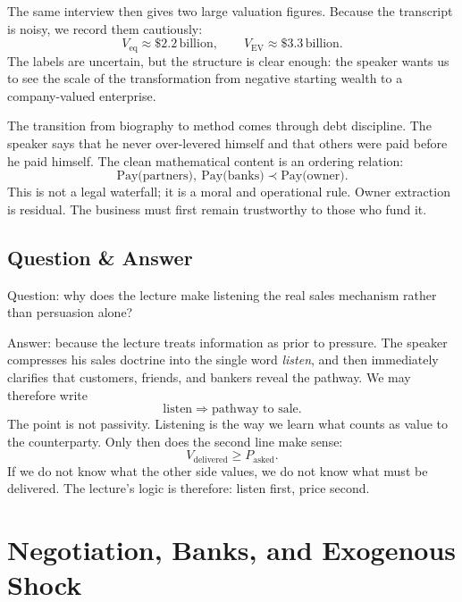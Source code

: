 The same interview then gives two large valuation figures. Because the transcript is noisy, we record them cautiously:
\begin{equation}
V_{\text{eq}} \approx \$2.2\,\text{billion}, \qquad V_{\text{EV}} \approx \$3.3\,\text{billion}.
\end{equation}
The labels are uncertain, but the structure is clear enough: the speaker wants us to see the scale of the transformation from negative starting wealth to a company-valued enterprise.

The transition from biography to method comes through debt discipline. The speaker says that he never over-levered himself and that others were paid before he paid himself. The clean mathematical content is an ordering relation:
\begin{equation}
\text{Pay(partners)},\ \text{Pay(banks)} \prec \text{Pay(owner)}.
\end{equation}
This is not a legal waterfall; it is a moral and operational rule. Owner extraction is residual. The business must first remain trustworthy to those who fund it.

\subsection{Question \& Answer}

Question: why does the lecture make listening the real sales mechanism rather than persuasion alone?

Answer: because the lecture treats information as prior to pressure. The speaker compresses his sales doctrine into the single word \emph{listen}, and then immediately clarifies that customers, friends, and bankers reveal the pathway. We may therefore write
\begin{equation}
\mathrm{listen} \Rightarrow \text{pathway to sale}.
\end{equation}
The point is not passivity. Listening is the way we learn what counts as value to the counterparty. Only then does the second line make sense:
\begin{equation}
V_{\text{delivered}} \ge P_{\text{asked}}.
\end{equation}
If we do not know what the other side values, we do not know what must be delivered. The lecture's logic is therefore: listen first, price second.

\section{Negotiation, Banks, and Exogenous Shock}

